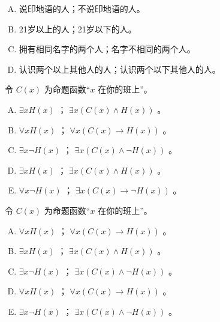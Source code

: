 {{        %
        \begin{practices}
            \begin{enumerate}[A.]
                \item 说印地语的人；不说印地语的人。
                \item 21岁以上的人；21岁以下的人。
                \item 拥有相同名字的两个人；名字不相同的两个人。
                \item 认识两个以上其他人的人；认识两个以下其他人的人。
            \end{enumerate}
        \end{practices}

        \begin{practices}
            令 $C(x)$ 为命题函数``$x$ 在你的班上''。
            \begin{enumerate}[A.]
                \item $\exists x H(x)$ ； $\exists x (C(x) \wedge H(x))$ 。
                \item $\forall x H(x)$ ； $\forall x (C(x) \rightarrow H(x))$ 。
                \item $\exists x \neg H(x)$ ； $\exists x (C(x) \wedge \neg H(x))$ 。
                \item $\exists x H(x)$ ； $\exists x (C(x) \wedge H(x))$ 。
                \item $\forall x \neg H(x)$ ； $\exists x (C(x) \rightarrow \neg H(x))$ 。
            \end{enumerate}
        \end{practices}

        \begin{practices}
            令 $C(x)$ 为命题函数``$x$ 在你的班上''。
            \begin{enumerate}[A.]
                \item $\forall x H(x)$ ； $\forall x (C(x) \rightarrow H(x))$ 。
                \item $\exists x H(x)$ ； $\exists x (C(x) \wedge H(x))$ 。
                \item $\exists x \neg H(x)$ ； $\exists x (C(x) \wedge \neg H(x))$ 。
                \item $\forall x H(x)$ ； $\forall x (C(x) \rightarrow H(x))$ 。
                \item $\exists x \neg H(x)$ ； $\exists x (C(x) \wedge \neg H(x))$ 。
            \end{enumerate}
        \end{practices}

}}
